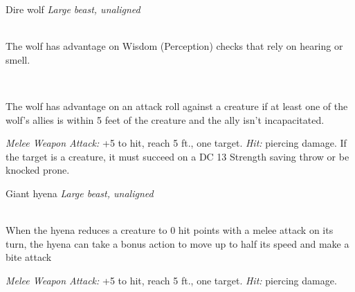 \documentclass[10pt,twoside,twocolumn,openany]{book}
\begin{document}
\begin{monsterboxnobg}{Dire wolf}
	\textit{Large beast, unaligned}\\
	\hline
	\basics[
		armorclass	= 14 (natural armor),
		hitpoints		= \dice{5d10 + 10},
		speed		= {50 ft.}
	]
	\hline
	\stats[
		STR	= \stat{17},
		DEX	= \stat{15},
		CON	= \stat{15},
		INT	= \stat{3},
		WIS	= \stat{12},
		CHA	= \stat{7}
	]
	\hline
	\details[
		skills			= {Perception +3, Stealth +4},
		senses		= {passive Perception 13},
		languages		= {-},
		challenge		= 1
	]
	\hline \\[1mm]
	\begin{monsteraction}
		The wolf has advantage on Wisdom (Perception) checks that rely on hearing or smell.
	\end{monsteraction}\\
	\begin{monsteraction}
		The wolf has advantage on an attack roll against a creature if at least one of the wolf's allies is within 5 feet of the creature and the ally isn't incapacitated.
	\end{monsteraction}
	\begin{monsteraction}[Bite]
		\textit{Melee Weapon Attack:} +5 to hit, reach 5 ft., one target. \textit{Hit:}  piercing damage. If the target is a creature, it must succeed on a DC 13 Strength saving throw or be knocked prone.
	\end{monsteraction}
\end{monsterboxnobg}

\begin{monsterboxnobg}{Giant hyena}
	\textit{Large beast, unaligned}\\
	\hline
	\basics[
		armorclass	= 12,
		hitpoints		= \dice{6d10 + 12},
		speed		= {50 ft.}
	]
	\hline
	\stats[
		STR	= \stat{16},
		DEX	= \stat{14},
		CON	= \stat{14},
		INT	= \stat{2},
		WIS	= \stat{12},
		CHA	= \stat{7}
	]
	\hline
	\details[
		skills			= {Perception +3},
		senses		= {passive Perception 13},
		languages		= {-},
		challenge		= 1
	]
	\hline \\[1mm]
	\begin{monsteraction}[Rampoge]
		When the hyena reduces a creature to 0 hit points with a melee attack on its turn, the hyena can take a bonus action to move up to half its speed and make a bite attack
	\end{monsteraction}
	\begin{monsteraction}[Bite]
		\textit{Melee Weapon Attack:} +5 to hit, reach 5 ft., one target. \textit{Hit:}  piercing damage.
	\end{monsteraction}
\end{monsterboxnobg}
\end{document}
